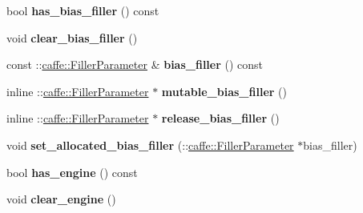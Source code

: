 \begin{DoxyCompactItemize}
\item 
\mbox{\label{classcaffe_1_1_convolution_parameter_acc290f632ab0ce1e9629444754573803}} 
bool {\bfseries has\+\_\+bias\+\_\+filler} () const
\item 
\mbox{\label{classcaffe_1_1_convolution_parameter_ac60ca294a7d9cd8d270e5b4dfd43916b}} 
void {\bfseries clear\+\_\+bias\+\_\+filler} ()
\item 
\mbox{\label{classcaffe_1_1_convolution_parameter_aa7c0725cbfef406058c715a44f85fe60}} 
const \+::\mbox{\hyperlink{classcaffe_1_1_filler_parameter}{caffe\+::\+Filler\+Parameter}} \& {\bfseries bias\+\_\+filler} () const
\item 
\mbox{\label{classcaffe_1_1_convolution_parameter_a819d76df19c0aacbae25258017f9b3b8}} 
inline \+::\mbox{\hyperlink{classcaffe_1_1_filler_parameter}{caffe\+::\+Filler\+Parameter}} $\ast$ {\bfseries mutable\+\_\+bias\+\_\+filler} ()
\item 
\mbox{\label{classcaffe_1_1_convolution_parameter_a1d978cc0bb0af0e085c93902b80184f2}} 
inline \+::\mbox{\hyperlink{classcaffe_1_1_filler_parameter}{caffe\+::\+Filler\+Parameter}} $\ast$ {\bfseries release\+\_\+bias\+\_\+filler} ()
\item 
\mbox{\label{classcaffe_1_1_convolution_parameter_a52277093d2b5bf97354751f5ba960fd9}} 
void {\bfseries set\+\_\+allocated\+\_\+bias\+\_\+filler} (\+::\mbox{\hyperlink{classcaffe_1_1_filler_parameter}{caffe\+::\+Filler\+Parameter}} $\ast$bias\+\_\+filler)
\item 
\mbox{\label{classcaffe_1_1_convolution_parameter_a8d65a155f4b446e5110da9a0d0c5e88f}} 
bool {\bfseries has\+\_\+engine} () const
\item 
\mbox{\label{classcaffe_1_1_convolution_parameter_ae0619b6f3bd68aa5d2c34828c1c58f51}} 
void {\bfseries clear\+\_\+engine} ()
\item 
\mbox{\label{classcaffe_1_1_convolution_parameter_ae300ae8275e13d7e79dbd0f117b67996}} 

\end{DoxyCompactItemize}
